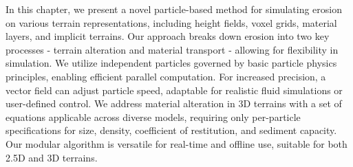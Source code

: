 
\abstract

In this chapter, we present a novel particle-based method for simulating erosion on various terrain representations, including height fields, voxel grids, material layers, and implicit terrains. Our approach breaks down erosion into two key processes - terrain alteration and material transport - allowing for flexibility in simulation. We utilize independent particles governed by basic particle physics principles, enabling efficient parallel computation. For increased precision, a vector field can adjust particle speed, adaptable for realistic fluid simulations or user-defined control. We address material alteration in 3D terrains with a set of equations applicable across diverse models, requiring only per-particle specifications for size, density, coefficient of restitution, and sediment capacity. Our modular algorithm is versatile for real-time and offline use, suitable for both 2.5D and 3D terrains.
\pagebreak

\minitoc


